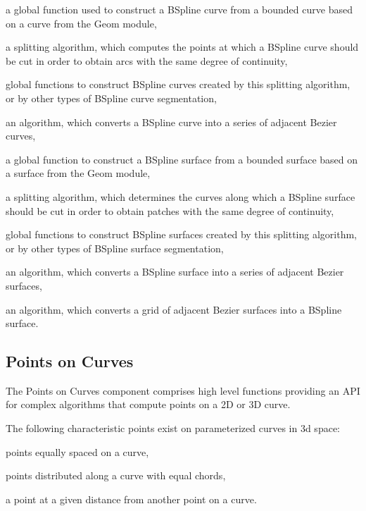 \begin{DoxyItemize}
\item a global function used to construct a B\+Spline curve from a bounded curve based on a curve from the Geom module,
\item a splitting algorithm, which computes the points at which a B\+Spline curve should be cut in order to obtain arcs with the same degree of continuity,
\item global functions to construct B\+Spline curves created by this splitting algorithm, or by other types of B\+Spline curve segmentation,
\item an algorithm, which converts a B\+Spline curve into a series of adjacent Bezier curves,
\item a global function to construct a B\+Spline surface from a bounded surface based on a surface from the Geom module,
\item a splitting algorithm, which determines the curves along which a B\+Spline surface should be cut in order to obtain patches with the same degree of continuity,
\item global functions to construct B\+Spline surfaces created by this splitting algorithm, or by other types of B\+Spline surface segmentation,
\item an algorithm, which converts a B\+Spline surface into a series of adjacent Bezier surfaces,
\item an algorithm, which converts a grid of adjacent Bezier surfaces into a B\+Spline surface.
\end{DoxyItemize}\hypertarget{occt_user_guides__modeling_data_occt_modat_1_4}{}\subsection{Points on Curves}\label{occt_user_guides__modeling_data_occt_modat_1_4}
The Points on Curves component comprises high level functions providing an A\+PI for complex algorithms that compute points on a 2D or 3D curve.

The following characteristic points exist on parameterized curves in 3d space\+:
\begin{DoxyItemize}
\item points equally spaced on a curve,
\item points distributed along a curve with equal chords,
\item a point at a given distance from another point on a curve.
\end{DoxyItemize}

